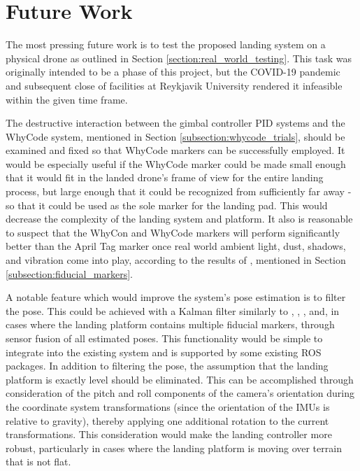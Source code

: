 \section{Future Work}

The most pressing future work is to test the proposed landing system on a physical drone as outlined in Section \ref{section:real_world_testing}. This task was originally intended to be a phase of this project, but the COVID-19 pandemic and subsequent close of facilities at Reykjavik University rendered it infeasible within the given time frame.

The destructive interaction between the gimbal controller PID systems and the WhyCode system, mentioned in Section \ref{subsection:whycode_trials}, should be examined and fixed so that WhyCode markers can be successfully employed. It would be especially useful if the WhyCode marker could be made small enough that it would fit in the landed drone's frame of view for the entire landing process, but large enough that it could be recognized from sufficiently far away - so that it could be used as the sole marker for the landing pad. This would decrease the complexity of the landing system and platform. It also is reasonable to suspect that the WhyCon and WhyCode markers will perform significantly better than the April Tag marker once real world ambient light, dust, shadows, and vibration come into play, according to the results of \cite{apriltag_whycon_comparison}, mentioned in Section \ref{subsection:fiducial_markers}.

A notable feature which would improve the system's pose estimation is to filter the pose. This could be achieved with a Kalman filter similarly to \cite{high_velocity_landing}, \cite{vision_based_x_platform}, \cite{visual_servoing}, and, in cases where the landing platform contains multiple fiducial markers, through sensor fusion of all estimated poses. This functionality would be simple to integrate into the existing system and is supported by some existing ROS packages. In addition to filtering the pose, the assumption that the landing platform is exactly level should be eliminated. This can be accomplished through consideration of the pitch and roll components of the camera's orientation during the coordinate system transformations (since the orientation of the IMUs is relative to gravity), thereby applying one additional rotation to the current transformations. This consideration would make the landing controller more robust, particularly in cases where the landing platform is moving over terrain that is not flat.

